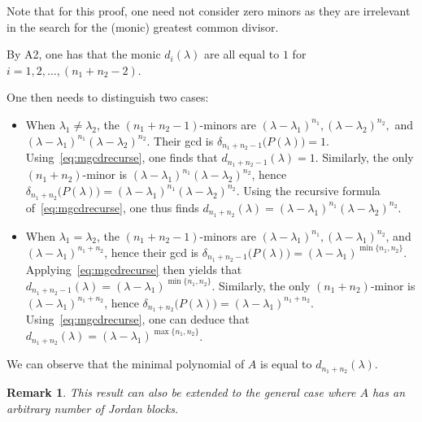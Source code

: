 \documentclass[11pt]{article}
\newtheorem*{remark}{Remark}
\begin{document}
Note that for this proof, one need not consider zero minors as they are irrelevant in the search for the (monic) greatest common divisor.

By A2, one has that the monic $d_i(\lambda)$ are all equal to \(1\) for $i = 1, 2, \dots, (n_1 + n_2 - 2)$.


One then needs to distinguish two cases:
\begin{itemize}
\item When $\lambda_1 \neq \lambda_2$, the \((n_1 + n_2 - 1)\)-minors are \((\lambda - \lambda_1)^{n_1},(\lambda - \lambda_2)^{n_2},\) and \((\lambda - \lambda_1)^{n_1}(\lambda - \lambda_2)^{n_2}\).
Their gcd is \(\delta_{n_1 + n_2 - 1}\big(P(\lambda)\big) = 1\).
Using~\eqref{eq:mgcdrecurse}, one finds that \(d_{n_1 + n_2 - 1}(\lambda) = 1\).
Similarly, the only \((n_1 + n_2)\)-minor is \((\lambda - \lambda_1)^{n_1}(\lambda - \lambda_2)^{n_2}\), hence \(\delta_{n_1 + n_2}\big(P(\lambda)\big) = (\lambda - \lambda_1)^{n_1}(\lambda - \lambda_2)^{n_2}\).
Using the recursive formula of~\eqref{eq:mgcdrecurse}, one thus finds \(d_{n_1 + n_2}(\lambda) = (\lambda - \lambda_1)^{n_1}(\lambda - \lambda_2)^{n_2}\).
\item When $\lambda_1 = \lambda_2$, the \((n_1 + n_2 - 1)\)-minors are \((\lambda - \lambda_1)^{n_1}, (\lambda - \lambda_1)^{n_2}\), and \((\lambda - \lambda_1)^{n_1 + n_2}\), hence their gcd is \(\delta_{n_1 + n_2 - 1}\big(P(\lambda)\big) = (\lambda - \lambda_1)^{\min\{n_1, n_2\}}\).
Applying~\eqref{eq:mgcdrecurse} then yields that \(d_{n_1 + n_2 - 1}(\lambda) = (\lambda - \lambda_1)^{\min\{n_1, n_2\}}\).
Similarly, the only \((n_1 + n_2)\)-minor is \((\lambda - \lambda_1)^{n_1 + n_2}\), hence \(\delta_{n_1 + n_2}\big(P(\lambda)\big) = (\lambda - \lambda_1)^{n_1 + n_2}\).
Using~\eqref{eq:mgcdrecurse}, one can deduce that \(d_{n_1 + n_2}(\lambda) = (\lambda - \lambda_1)^{\max\{n_1, n_2\}}\).
\end{itemize}

We can observe that the minimal polynomial of $A$ is equal to $d_{n_1+n_2}(\lambda)$.

\begin{remark}
This result can also be extended to the general case where \(A\) has an arbitrary number of Jordan blocks.
\end{remark}
\end{document}
